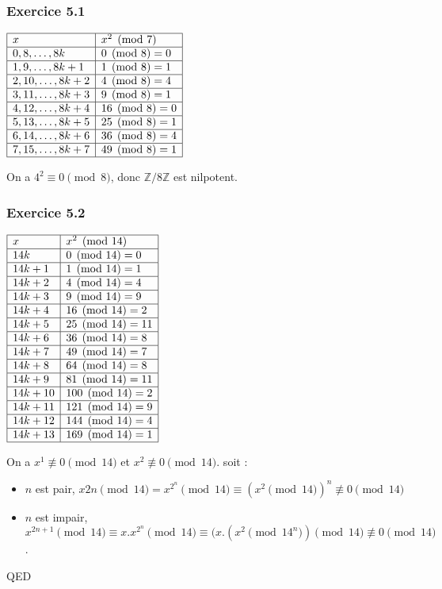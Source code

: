 \documentclass[]{book}
\theoremstyle{definition}
\newcommand{\bb}[1]{\mathbb{#1}}
\newcommand{\Z}{\bb{Z}}
\begin{document}
\subsubsection*{Exercice 5.1}
$
\begin{array}{|l|l|}
\hline
x & x^2 \pmod{7} \\
\hline
0,8,\ldots,8k & 0 \pmod{8} = 0  \\
\hline
1,9,\ldots,8k+1 & 1 \pmod{8} = 1 \\
\hline
2,10,\ldots,8k+2 & 4 \pmod{8} = 4 \\
\hline
3,11,\ldots,8k+3 & 9 \pmod{8} = 1 \\
\hline
4,12,\ldots,8k+4 & 16 \pmod{8} = 0 \\
\hline
5,13,\ldots,8k+5 & 25 \pmod{8} = 1 \\
\hline
6,14,\ldots,8k+6 & 36 \pmod{8} = 4 \\
\hline
7,15,\ldots,8k+7 & 49 \pmod{8} = 1 \\
\hline
\end{array}
$

On a $4^2 \equiv 0 \pmod{8}$, donc $\Z/8\Z$ est nilpotent.

\subsubsection*{Exercice 5.2}
$
\begin{array}{|l|l|}
\hline
x & x^2 \pmod{14} \\
\hline
14k & 0 \pmod{14} = 0 \\
\hline
14k+1 & 1 \pmod{14} = 1 \\
\hline
14k+2 & 4 \pmod{14} = 4  \\
\hline
14k+3 & 9 \pmod{14} = 9  \\
\hline
14k+4 & 16 \pmod{14} = 2 \\
\hline
14k+5 & 25 \pmod{14} = 11 \\
\hline
14k+6 & 36 \pmod{14} = 8 \\
\hline
14k+7 & 49 \pmod{14} = 7 \\
\hline
14k+8 & 64 \pmod{14} = 8 \\
\hline
14k+9 & 81 \pmod{14} = 11 \\
\hline
14k+10 & 100 \pmod{14} = 2 \\
\hline
14k+11 & 121 \pmod{14} = 9 \\
\hline
14k+12 & 144 \pmod{14} = 4 \\
\hline
14k+13 & 169 \pmod{14} = 1  \\
\hline
\end{array}
$

On a  $x^1 \not \equiv 0 \pmod{14}$ et $x^2 \not \equiv 0 \pmod{14}$. soit :
\begin{itemize}
\item $n$ est pair, $x{2n} \pmod{14} = x^{2^n}\pmod{14} \equiv (x^{2} \pmod{14})^n \not \equiv 0 \pmod{14}$ 

\item $n$ est impair,  $x^{2n+1} \pmod {14} \equiv x.x^{2^n} \pmod {14} \equiv (x.(x^2 \pmod {14}^n) \pmod {14} \not \equiv 0 \pmod{14}$.  

\end{itemize}
QED
\end{document}
